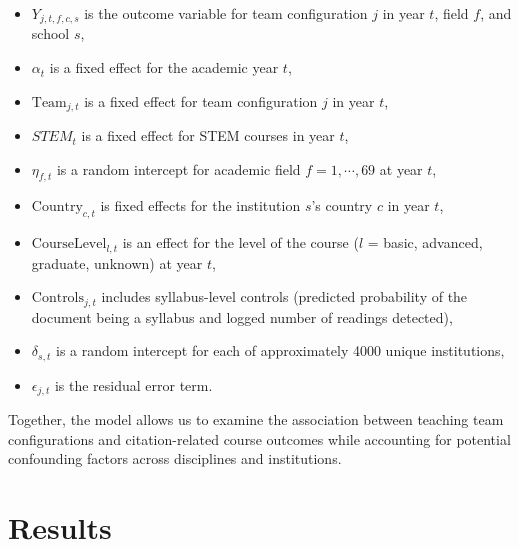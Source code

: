\documentclass[
  british,
  12pt, %
]{article}
\begin{document}
\begin{itemize}
\item
  \(Y_{j, t, f, c, s}\) is the outcome variable for team configuration \(j\) in year \(t\), field \(f\), and school \(s\),
\item
  \(\alpha_{t}\) is a fixed effect for the academic year \(t\),
\item
  \(\text{Team}_{j, t}\) is a fixed effect for team configuration \(j\) in year \(t\),
\item
  \(STEM_{t}\) is a fixed effect for STEM courses in year \(t\),
\item
  \(\eta_{f,t}\) is a random intercept for academic field \(f = 1,\cdots, 69\) at year \(t\),
\item
  \(\text{Country}_{c, t}\) is fixed effects for the institution \(s\)'s country \(c\) in year \(t\),
\item
  \(\text{CourseLevel}_{l, t}\) is an effect for the level of the course (\(l\) = basic, advanced, graduate, unknown) at year \(t\),
\item
  \(\text{Controls}_{j,t}\) includes syllabus-level controls (predicted probability of the document being a syllabus and logged number of readings detected),
\item
  \(\delta_{s, t}\) is a random intercept for each of approximately 4000 unique institutions,
\item
  \(\epsilon_{j,t}\) is the residual error term.
\end{itemize}

Together, the model allows us to examine the association between teaching team configurations and citation-related course outcomes while accounting for potential confounding factors across disciplines and institutions.

\section{Results}\label{results}
\end{document}
